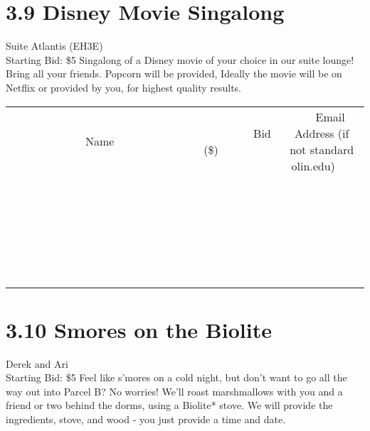 \documentclass[11pt]{article}
\begin{document}
\section*{3.9 Disney Movie Singalong}
Suite Atlantis (EH3E)
\\
Starting Bid: \$5
\newline
Singalong of a Disney movie of your choice in our suite lounge! Bring all your friends. Popcorn will be provided, Ideally the movie will be on Netflix or provided by you, for highest quality results.
\\[6ex]
\begin{tabular}{c c c}
~~~~~~~~~~~~~Name~~~~~~~~~~~~~ & ~~~~~~~~~Bid (\$)~~~~~~~~~  & ~~~Email Address (if not standard olin.edu)~~~\\
 & & \\
\hline
 & & \\
\hline
 & & \\
\hline
 & & \\
\hline
 & & \\
\hline
 & & \\
\hline
 & & \\
\hline
 & & \\
\hline
 & & \\
\hline
 & & \\
\hline
 & & \\
\hline
 & & \\
\hline
 & & \\
\hline
 & & \\
\hline
 & & \\
\hline
 & & \\
\hline
 & & \\
\hline
 & & \\
\hline
 & & \\
\hline
 & & \\
\hline
 & & \\
\hline
 & & \\
\hline
 & & \\
\hline
 & & \\
\hline
 & & \\
\hline
 & & \\
\hline
\end{tabular}
\newpage
\section*{3.10 Smores on the Biolite}
Derek and Ari
\\
Starting Bid: \$5
\newline
Feel like s'mores on a cold night, but don't want to go all the way out into Parcel B? No worries! We'll roast marshmallows with you and a friend or two behind the dorms, using a Biolite* stove. We will provide the ingredients, stove, and wood - you just provide a time and date.
\end{document}
